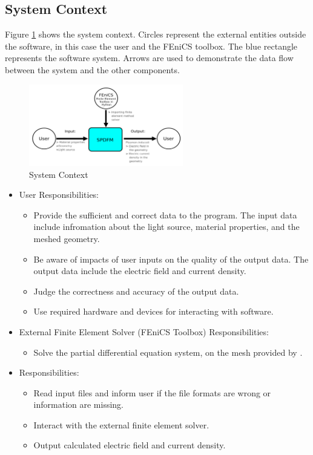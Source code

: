 \documentclass[12pt]{article}
\begin{document}
	\subsection{System Context}
	
	Figure \ref{Fig_SystemContext} shows the system context. Circles represent the
	external entities outside the software, in this case the user and the FEniCS
	toolbox. The blue rectangle represents the \progname software system. Arrows are
	used to demonstrate the data flow between the system and the other components.
	\begin{figure}[h!] \begin{center}
			\includegraphics[width=0.6\textwidth]{SystemContextFigure.png} \caption{System
				Context} \label{Fig_SystemContext} \end{center} \end{figure}
	
	
	\begin{itemize} \item User Responsibilities: \begin{itemize} \item Provide the
			sufficient and correct data to the program. The input data include infromation about the light source, material properties, and the meshed geometry.
	\item Be aware of impacts of user
			inputs on the quality of the output data. The output data include the electric field and current density.
	\item Judge the correctness and accuracy of
			the output data.
	\item Use required hardware and devices for interacting with software.
		\end{itemize}
		
		\item External Finite Element Solver (FEniCS Toolbox) Responsibilities: \begin{itemize} \item Solve the partial differential equation system, on the mesh provided by \progname{}.
		\end{itemize}
		
		
		\item \progname{} Responsibilities: \begin{itemize} 
			\item Read input files and inform user if
			the file formats are wrong or information are missing. \item Interact with the external finite element solver. \item Output calculated electric field and current density.
		\end{itemize} \end{itemize}
	
\end{document}
